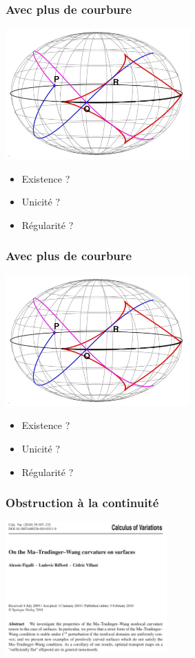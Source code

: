 \documentclass[9pt]{beamer}
\begin{document}
\begin{frame}
\frametitle{\bf Avec plus de courbure}
 
\centering \includegraphics[height=5.0cm]{ellip}

\begin{itemize}
  \item Existence ?
  \item Unicit\'e ?
  \item R\'egularit\'e ?
\end{itemize}

\end{frame}

\begin{frame}
\frametitle{\bf Avec plus de courbure}
 
\centering \includegraphics[height=5.0cm]{ellip}

\begin{itemize}
  \item Existence ?
  \item Unicit\'e ?
  \item R\'egularit\'e ?
\end{itemize}

\end{frame}

\begin{frame}
\frametitle{\bf Obstruction à la continuité}
 
\centering \includegraphics[height=5.0cm]{figal1}

\end{frame}
\end{document}
